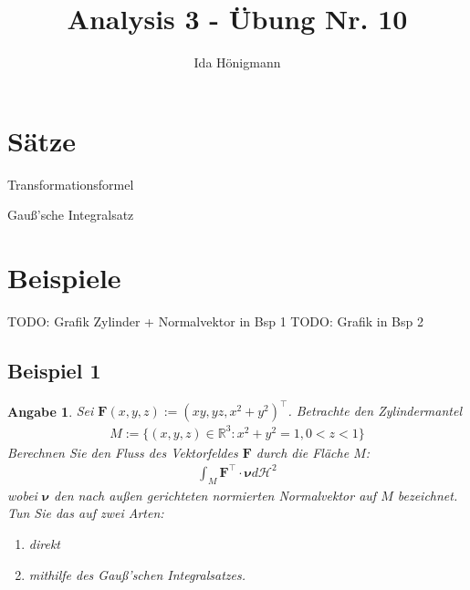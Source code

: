 \documentclass[]{article}
\title{Analysis 3 - Übung Nr. 10}
\author{Ida Hönigmann}
\newtheorem*{angabe*}{Angabe}
\begin{document}
\maketitle

\section{Sätze}

Transformationsformel

Gauß'sche Integralsatz

\section{Beispiele}

TODO: Grafik Zylinder + Normalvektor in Bsp 1
TODO: Grafik in Bsp 2

\subsection*{Beispiel 1}
\begin{angabe*}
	Sei $\bm{F}(x,y,z) := (xy, yz, x^2+y^2)^\top$. Betrachte den Zylindermantel
	\begin{align*}
		M := \{(x,y,z) \in \mathbb{R}^3: x^2+y^2=1, 0<z<1\}
	\end{align*}
	Berechnen Sie den Fluss des Vektorfeldes $\mathbf{F}$ durch die Fläche $M$:
	\begin{align*}
		\int_M \bm{F}^\top \cdot \bm{\nu} d\mathcal{H}^2
	\end{align*}
	wobei $\bm{\nu}$ den nach außen gerichteten normierten Normalvektor auf $M$ bezeichnet.
	Tun Sie das auf zwei Arten:
	\begin{enumerate}[label=(\roman*)]
		\item direkt
		\item mithilfe des Gauß'schen Integralsatzes.
	\end{enumerate}
\end{angabe*}
\end{document}

